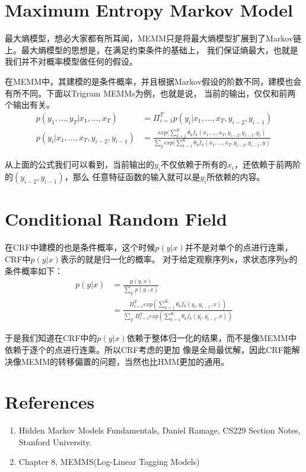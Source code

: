 \documentclass[UTF8]{ctexart}
\begin{document}
\section{Maximum Entropy Markov Model}
最大熵模型，想必大家都有所耳闻，MEMM只是将最大熵模型扩展到了Markov链上。最大熵模型的思想是，在满足约束条件的基础上，
我们保证熵最大，也就是我们并不对概率模型做任何的假设。
\par
在MEMM中，其建模的是条件概率，并且根据Markov假设的阶数不同，建模也会有所不同。下面以Trigram MEMMs为例，也就是说，
当前的输出，仅仅和前两个输出有关。
\begin{align}
p(y_1, ..., y_T | x_1, ..., x_T) &= 
\Pi_{i=1}^T p(y_i|x_1, ..., x_T, y_{i-2}, y_{i-1})
\\
p(y_i|x_1, ..., x_T, y_{i-2}, y_{i-1}) &= 
\frac{exp(\sum_{k=1}^K \theta_{k}f_k(x_1, ..., x_T, y_{i-2}, y_{i-1}, y_i)}
{\sum_y exp(\sum_{k=1}^K \theta_{k}f_k(x_1, ..., x_T, y_{i-2}, y_{i-1}, y)}
\end{align}
\par
从上面的公式我们可以看到，当前输出的$y_i$不仅依赖于所有的$x_i$，还依赖于前两阶的$(y_{i-2}, y_{i-1})$，那么
任意特征函数的输入就可以是$y_i$所依赖的内容。

\section{Conditional Random Field}

在CRF中建模的也是条件概率，这个时候$p(y|x)$并不是对单个的点进行连乘，CRF中$p(y|x)$表示的就是归一化的概率。
对于给定观察序列$\textbf{x}$，求状态序列$\textbf{y}$的条件概率如下：
\begin{align}
p(y|x) &= \frac{p(y, x)}{\sum_{y^{'}}p(y^{'}, x)}
\\
&= \frac{\Pi_{t=1}^T exp(\sum_{k=1}^K \theta_k f_k(y_t, y_{t-1}, x))}
{\sum_{y^{'}} \Pi_{t=1}^T exp(\sum_{k=1}^K \theta_k f_k(y_t^{'}, y_{t-1}^{'}, x)) }
\end{align}
\par
于是我们知道在CRF中的$p(y|x)$依赖于整体归一化的结果，而不是像MEMM中依赖于逐个的点进行连乘。所以CRF考虑的更加
像是全局最优解，因此CRF能解决像MEMM的转移偏置的问题，当然也比HMM更加的通用。

\section{References}
\begin{enumerate}
\item Hidden Markov Models Fundamentals, Daniel Ramage, CS229 Section Notes, Stanford University.
\item Chapter 8, MEMMS(Log-Linear Tagging Models)

\end{enumerate}
\end{document}
